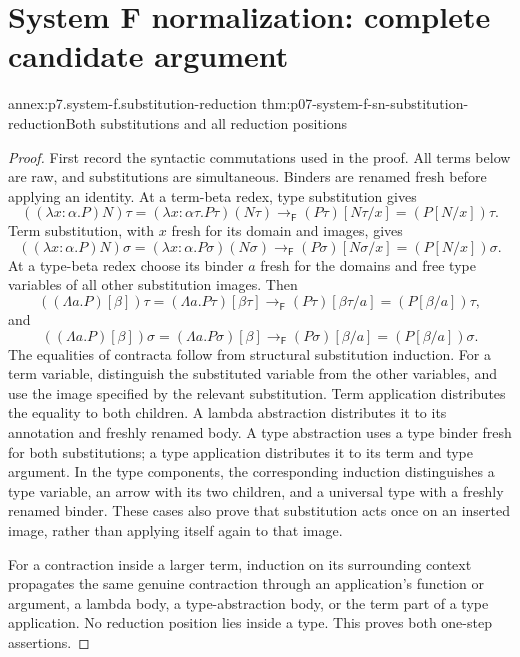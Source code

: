 \section{System F normalization: complete candidate argument}
\label{sec:annex-p07-system-f-normalization}

\begin{annexitem}{annex:p7.system-f.substitution-reduction}
 {thm:p07-system-f-sn-substitution-reduction}{Both substitutions and all reduction positions}
\begin{proof}
First record the syntactic commutations used in the proof. All terms below
are raw, and substitutions are simultaneous. Binders are renamed fresh
before applying an identity. At a term-beta redex, type substitution gives
\[
 ((\lambda x{:}\alpha.P)N)\tau
  =(\lambda x{:}\alpha\tau.P\tau)(N\tau)
  \to_{\mathsf F}(P\tau)[N\tau/x]
  =(P[N/x])\tau.
\]
Term substitution, with \(x\) fresh for its domain and images, gives
\[
 ((\lambda x{:}\alpha.P)N)\sigma
  =(\lambda x{:}\alpha.P\sigma)(N\sigma)
  \to_{\mathsf F}(P\sigma)[N\sigma/x]
  =(P[N/x])\sigma.
\]
At a type-beta redex choose its binder \(a\) fresh for the domains and
free type variables of all other substitution images. Then
\[
 ((\Lambda a.P)[\beta])\tau
  =(\Lambda a.P\tau)[\beta\tau]
  \to_{\mathsf F}(P\tau)[\beta\tau/a]
  =(P[\beta/a])\tau,
\]
and
\[
 ((\Lambda a.P)[\beta])\sigma
  =(\Lambda a.P\sigma)[\beta]
  \to_{\mathsf F}(P\sigma)[\beta/a]
  =(P[\beta/a])\sigma.
\]
The equalities of contracta follow from structural substitution induction.
For a term variable, distinguish the substituted variable from the other
variables, and use the image specified by the relevant substitution.
Term application distributes the equality to both children. A lambda
abstraction distributes it to its annotation and freshly renamed body.
A type abstraction uses a type binder fresh for both substitutions; a type
application distributes it to its term and type argument. In the type
components, the corresponding induction distinguishes a type variable,
an arrow with its two children, and a universal type with a freshly renamed
binder. These cases also prove that substitution acts once on an inserted
image, rather than applying itself again to that image.

For a contraction inside a larger term, induction on its surrounding
context propagates the same genuine contraction through an application's
function or argument, a lambda body, a type-abstraction body, or the term
part of a type application. No reduction position lies inside a type.
This proves both one-step assertions.


\end{proof}
\end{annexitem}
